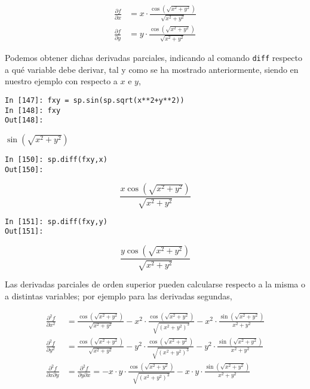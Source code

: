 \begin{align*}
\frac{\partial f}{\partial x} &= x\cdot\frac{\cos(\sqrt{x^2+y^2})}{\sqrt{x^2+y^2}} \\
\frac{\partial f}{\partial y} &= y\cdot\frac{\cos(\sqrt{x^2+y^2})}{\sqrt{x^2+y^2}}
\end{align*}
\begin{paracol}{2}
Podemos obtener dichas derivadas parciales, indicando al comando \texttt{diff} respecto a qué variable debe derivar, tal y como se ha mostrado anteriormente, siendo en nuestro ejemplo con respecto a $x$ e $y$,
\end{paracol}
\begin{center}
	\begin{minipage}{.5\textwidth}
		\begin{verbatim}
In [147]: fxy = sp.sin(sp.sqrt(x**2+y**2))
In [148]: fxy
Out[148]: 	
		\end{verbatim}
		$\sin(\sqrt{x^2+ y^2})$
		\begin{verbatim}
In [150]: sp.diff(fxy,x)
Out[150]: 
		\end{verbatim}
		\begin{equation*} \frac{x\cos(\sqrt{x^2+y^2})}{\sqrt{x^2+y^2}}\end{equation*}
		\begin{verbatim}
In [151]: sp.diff(fxy,y)
Out[151]:   
		\end{verbatim}
		\begin{equation*} \frac{y\cos(\sqrt{x^2+y^2})}{\sqrt{x^2+y^2}}\end{equation*}
	\end{minipage}
\end{center}

\begin{paracol}{2}
Las derivadas parciales de orden superior pueden calcularse respecto a la misma o a distintas variables; por ejemplo para las derivadas segundas,
\end{paracol}
\begin{align*}
\frac{\partial^2f}{\partial x^2} &= \frac{\cos(\sqrt{x^2+y^2})}{\sqrt{x^2+y^2}} - 
x^2 \cdot \frac{\cos(\sqrt{x^2+y^2})}{\sqrt{(x^2+y^2)^3}} -
x^2 \cdot \frac{\sin(\sqrt{x^2+y^2})}{x^2+y^2} \\
\frac{\partial^2f}{\partial y^2} &= \frac{\cos(\sqrt{x^2+y^2})}{\sqrt{x^2+y^2}} - 
y^2 \cdot \frac{\cos(\sqrt{x^2+y^2})}{\sqrt{(x^2+y^2)^3}} -
y^2 \cdot \frac{\sin(\sqrt{x^2+y^2})}{x^2+y^2} \\
\frac{\partial^2f}{\partial x\partial y} &= \frac{\partial^2f}{\partial y\partial x} =-x\cdot y\cdot\frac{\cos(\sqrt{x^2+y^2})}{\sqrt{(x^2+y^2)^3}} - 
x\cdot y \cdot\frac{\sin(\sqrt{x^2+y^2})}{x^2+y^2} 
\end{align*}

